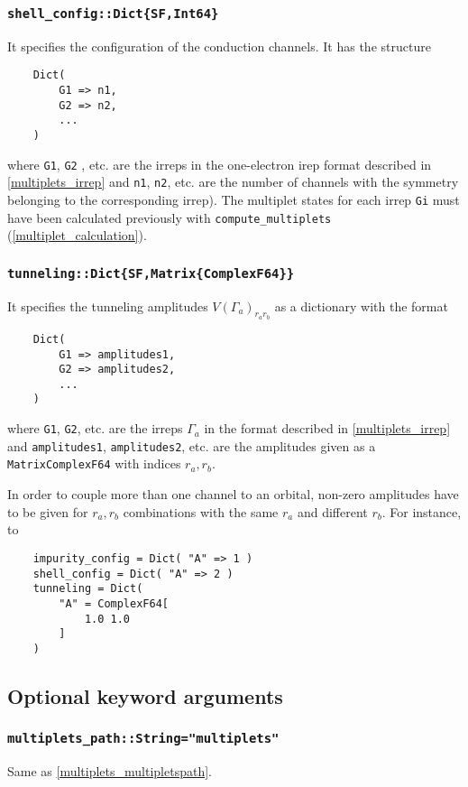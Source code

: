 \documentclass[notitlepage]{article}
\begin{document}
\subsubsection{\texttt{shell\_config::Dict\{SF,Int64\}}}
\label{nrg_shellconfig}
It specifies the configuration of the conduction channels.
It has the structure
\begin{verbatim}
    Dict( 
        G1 => n1,
        G2 => n2,
        ...
    )
\end{verbatim}
where \texttt{G1}, \texttt{G2} , etc. are the irreps in the
one-electron irep format described in \ref{multiplets_irrep}
and \texttt{n1}, \texttt{n2}, etc. are the number of
channels with the symmetry belonging to the corresponding
irrep). The multiplet states for each irrep \texttt{Gi} must
have been calculated previously with
\texttt{compute\_multiplets} (\ref{multiplet_calculation}).

\subsubsection{\texttt{tunneling::Dict\{SF,Matrix\{ComplexF64\}\}}}
\label{nrg_tunnneling}
It specifies the tunneling amplitudes $V(\Gamma_a)_{r_a
r_b}$ as a dictionary with the format
\begin{verbatim}
    Dict(
        G1 => amplitudes1,
        G2 => amplitudes2,
        ...
    )
\end{verbatim}
where \texttt{G1}, \texttt{G2}, etc. are the irreps
$\Gamma_a$ in the format described in \ref{multiplets_irrep}
and \texttt{amplitudes1}, \texttt{amplitudes2}, etc. are the
amplitudes given as a \texttt{Matrix{ComplexF64}} with
indices $r_a,r_b$.
\par
In order to couple more than one channel to an orbital,
non-zero amplitudes have to be given for $r_a,r_b$
combinations with the same $r_a$ and different $r_b$. For
instance, to 
\begin{verbatim}
    impurity_config = Dict( "A" => 1 )
    shell_config = Dict( "A" => 2 )
    tunneling = Dict(
        "A" = ComplexF64[
            1.0 1.0
        ]
    )
\end{verbatim}


\subsection{Optional keyword arguments}

\subsubsection{\texttt{multiplets\_path::String="multiplets"}}
\label{nrg_multipletspath}
Same as \ref{multiplets_multipletspath}.
\end{document}
